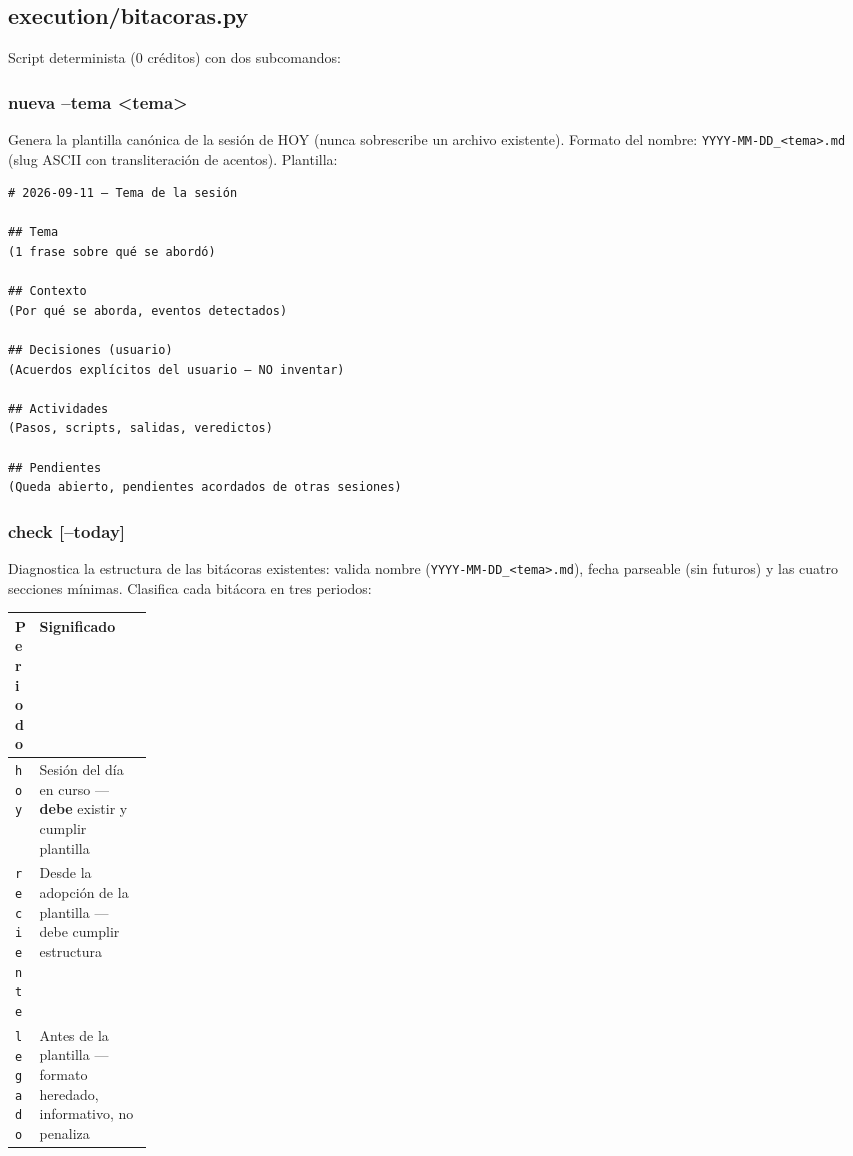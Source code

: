 \documentclass[11pt,a4paper]{article}
\begin{document}
\subsection{execution/bitacoras.py}

Script determinista (0 créditos) con dos subcomandos:

\subsubsection{nueva --tema \textless{}tema\textgreater{}}
Genera la plantilla canónica de la sesión de HOY (nunca sobrescribe un archivo
existente). Formato del nombre: \texttt{YYYY-MM-DD\_\textless{}tema\textgreater{}.md}
(slug ASCII con transliteración de acentos). Plantilla:

\begin{lstlisting}
# 2026-09-11 — Tema de la sesión

## Tema
(1 frase sobre qué se abordó)

## Contexto
(Por qué se aborda, eventos detectados)

## Decisiones (usuario)
(Acuerdos explícitos del usuario — NO inventar)

## Actividades
(Pasos, scripts, salidas, veredictos)

## Pendientes
(Queda abierto, pendientes acordados de otras sesiones)
\end{lstlisting}

\subsubsection{check [--today]}
Diagnostica la estructura de las bitácoras existentes: valida nombre
(\texttt{YYYY-MM-DD\_\textless{}tema\textgreater{}.md}), fecha parseable (sin
futuros) y las cuatro secciones mínimas. Clasifica cada bitácora en tres periodos:

\begin{center}
\begin{tabularx}{\linewidth}{>{\raggedright\arraybackslash}p{0.16\linewidth} X}
\toprule
\textbf{Periodo} & \textbf{Significado} \\
\midrule
\texttt{hoy} & Sesión del día en curso — \textbf{debe} existir y cumplir plantilla \\
\texttt{reciente} & Desde la adopción de la plantilla — debe cumplir estructura \\
\texttt{legado} & Antes de la plantilla — formato heredado, informativo, no penaliza \\
\bottomrule
\end{tabularx}
\end{center}
\end{document}
